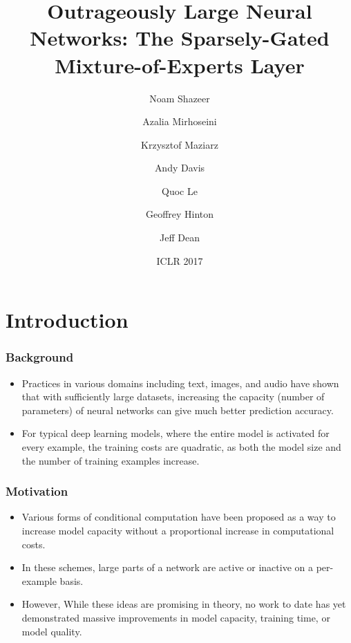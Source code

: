 \documentclass[12pt,aspectratio=169]{beamer}
\title{Outrageously Large Neural Networks: The Sparsely-Gated Mixture-of-Experts Layer}
\author{Noam Shazeer\inst{1} \and Azalia Mirhoseini\inst{1} \and Krzysztof Maziarz\inst{2} \and Andy Davis\inst{1} \and Quoc Le\inst{1} \and Geoffrey Hinton\inst{1} \and Jeff Dean\inst{1}}
\institute{\inst{1} Google Brain
           \inst{2} Jagiellonian University, Cracow}
\date{ICLR 2017}
\begin{document}
    \beamertemplatenavigationsymbolsempty

    \makeatletter
    \def\beamer@andinst{\\[.1em]}
    \makeatother

    \begin{frame}
        \titlepage
    \end{frame}

    \section{Introduction}

    \begin{frame}
        \frametitle{Background}

        \begin{itemize}
            \setlength{\itemsep}{.8em}
            \item Practices in various domains including text, images, and audio have shown that with sufficiently large datasets, increasing the capacity (number of parameters) of neural networks can give much better prediction accuracy.
            \item For typical deep learning models, where the entire model is activated for every example, the training costs are quadratic, as both the model size and the number of training examples increase.
        \end{itemize}
    \end{frame}

    \begin{frame}
        \frametitle{Motivation}

        \begin{itemize}
            \setlength{\itemsep}{.8em}
            \item Various forms of conditional computation have been proposed as a way to increase model capacity without a proportional increase in computational costs.
            \item In these schemes, large parts of a network are active or inactive on a per-example basis.
            \item However, While these ideas are promising in theory, no work to date has yet demonstrated massive improvements in model capacity, training time, or model quality.
        \end{itemize}
    \end{frame}
\end{document}

